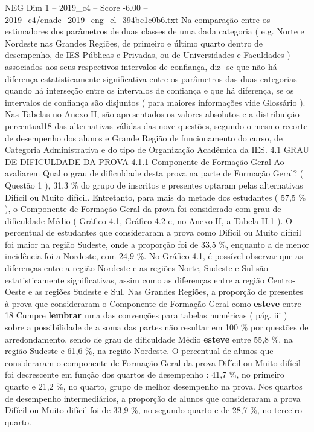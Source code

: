 \begin{textsample}{NEG Dim 1 – 2019\_c4 – Score -6.00 – 2019\_c4/enade\_2019\_eng\_el\_394be1c0b6.txt}
Na comparação entre os estimadores dos parâmetros de duas classes de uma dada categoria ( e.g.
Norte e Nordeste nas Grandes Regiões, de primeiro e último quarto dentro de desempenho, de IES Públicas e Privadas, ou de Universidades e Faculdades ) associados aos seus respectivos intervalos de confiança, diz -se que não há diferença estatisticamente significativa entre os parâmetros das duas categorias quando há interseção entre os intervalos de confiança e que há diferença, se os intervalos de confiança são disjuntos ( para maiores informações vide Glossário ).
Nas Tabelas no Anexo II, são apresentados os valores absolutos e a distribuição percentual18 das alternativas válidas das nove questões, segundo o mesmo recorte de desempenho dos alunos e Grande Região de funcionamento do curso, de Categoria Administrativa e do tipo de Organização Acadêmica da IES. 4.1 GRAU DE DIFICULDADE DA PROVA 4.1.1 Componente de Formação Geral Ao avaliarem Qual o grau de dificuldade desta prova na parte de Formação Geral? ( Questão 1 ), 31,3 \% do grupo de inscritos e presentes optaram pelas alternativas Difícil ou Muito difícil.
Entretanto, para mais da metade dos estudantes ( 57,5 \% ), o Componente de Formação Geral da prova foi considerado com grau de dificuldade Médio ( Gráfico 4.1, Gráfico 4.2 e, no Anexo II, a Tabela II.1 ).
O percentual de estudantes que consideraram a prova como Difícil ou Muito difícil foi maior na região Sudeste, onde a proporção foi de 33,5 \%, enquanto a de menor incidência foi a Nordeste, com 24,9 \%.
No Gráfico 4.1, é possível observar que as diferenças entre a região Nordeste e as regiões Norte, Sudeste e Sul são estatisticamente significativas, assim como as diferenças entre a região Centro-Oeste e as regiões Sudeste e Sul.
Nas Grandes Regiões, a proporção de presentes à prova que consideraram o Componente de Formação Geral como \textbf{esteve} entre 18 Cumpre \textbf{lembrar} uma das convenções para tabelas numéricas ( pág. iii ) sobre a possibilidade de a soma das partes não resultar em 100 \% por questões de arredondamento. sendo de grau de dificuldade Médio \textbf{esteve} entre 55,8 \%, na região Sudeste e 61,6 \%, na região Nordeste.
O percentual de alunos que consideraram o componente de Formação Geral da prova Difícil ou Muito difícil foi decrescente em função dos quartos de desempenho : 41,7 \%, no primeiro quarto e 21,2 \%, no quarto, grupo de melhor desempenho na prova.
Nos quartos de desempenho intermediários, a proporção de alunos que consideraram a prova Difícil ou Muito difícil foi de 33,9 \%, no segundo quarto e de 28,7 \%, no terceiro quarto.

\end{textsample}
